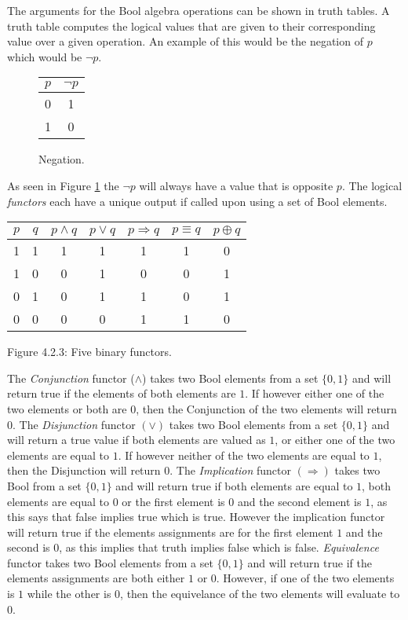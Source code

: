\documentclass[11pt,a4paper]{report}
\begin{document}
The arguments for the Bool algebra operations can be shown in truth tables. A truth table computes the logical values that are given to their corresponding value over a given operation. An example of this would be the negation of $p$ which would be $\neg p$.

\begin{figure}[H]
\centering
\label{tab:negation}
\begin{tabular}{|c|c|}
\hline
$p$ & $\neg p$\\ \hline
0 & 1 \\
1 & 0 \\
\hline
\end{tabular}
\caption{Negation.}
\end{figure}

As seen in Figure \ref{tab:negation} the $\neg p$ will always have a value that is opposite $p$.
The logical \emph{functors} each have a unique output if called upon using a set of Bool elements.
\begin{center}
\begin{tabular}{|c|c||c|c|c|c|c|}
\hline
$p$ & $q$ & $p \land q$ & $p \lor q$ & $p \Rightarrow q$ & $p \equiv q$ & $p \oplus q$		\\ \hline
1 & 1 & 1 & 1 & 1 & 1 & 0\\
1 & 0 & 0 & 1 & 0 & 0 & 1\\
0 & 1 & 0 & 1 & 1 & 0 & 1\\
0 & 0 & 0 & 0 & 1 & 1 & 0\\
\hline
\end{tabular}
\end{center}
\begin{center}
\label{Figure:4.2.3}{Figure 4.2.3: Five binary functors.}
\end{center}
The \emph{Conjunction} functor ($\land$) takes two Bool elements from a set $\{0,1\}$ and will return true if the elements of both elements are $1$. If however either one of the two elements or both are $0$, then the Conjunction of the two elements will return $0$. The \emph{Disjunction} functor $(\lor)$ takes two Bool elements from a set $\{0,1\}$ and will return a true value if both elements are valued as $1$, or either one of the two elements are equal to $1$. If however neither of the two elements are equal to $1$, then the Disjunction will return $0$. The \emph{Implication} functor $(\Rightarrow)$ takes two Bool from a set $\{0,1\}$ and will return true if both elements are equal to $1$, both elements are equal to $0$ or the first element is $0$ and the second element is $1$, as this says that false implies true which is true. However the implication functor will return true if the elements assignments are for the first element $1$ and the second is $0$, as this implies that truth implies false which is false. \emph{Equivalence} functor takes two Bool elements from a set $\{0,1\}$ and will return true if the elements assignments are both either $1$ or $0$. However, if one of the two elements is $1$ while the other is $0$, then the equivelance of the two elements will evaluate to $0$.
\end{document}
